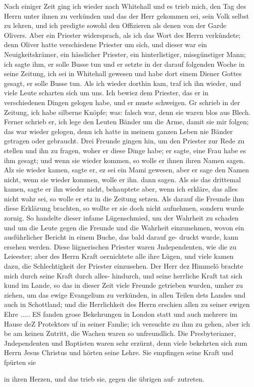 Nach einiger Zeit ging ich wieder nach Whitehall und es
trieb mich, den Tag des Herrn unter ihnen zu verkünden und
das der Herr gekommen sei, sein Volk selbst zu lehren, und ich
predigte sowohl den Offizieren 
als denen von der Garde Olivers.
Aber ein Priester widersprach, als ich das Wort des Herrn
verkündete; denn Oliver hatte verschiedene Priester um sich, und
dieser war ein Neuigkeitskrämer, ein hässlicher Priester, ein 
hinterlistiger, missgünstiger Mann; ich sagte ihm, er solle Busse tun
und er setzte in der darauf folgenden Woche in seine Zeitung,
ich sei in Whitehall gewesen und habe dort einem Diener Gottes
gesagt, er solle Busse tun. Als ich wieder dorthin kam, traf ich
ihn wieder, und viele Leute scharten sich um uns. Ich bewiez
dem Priester, das er in verschiedenen Dingen gelogen habe, und
er muste schweigen. Gr schrieb in der Zeitung, ich habe silberne
Knöpfe; was: falsch war, denn sie waren blos aus Blech. Ferner
schrieb er, ich lege den Leuten Bänder um die Arme, damit sie
mir folgen; das war wieder gelogen, denn ich hatte in meinem
ganzen Leben nie Bänder getragen oder gebraucht. Drei Freunde
gingen hin, um den Priester zur Rede zu stellen und ihn zu
fragen, woher er diese Dinge habe; er sagte, eine Frau habe es
ihm gesagt; und wenn sie wieder kommen, so wolle er ihnen ihren
Namen sagen. Alz sie wieder kamen, sagte er, ez sei ein Mami
gewesen, aber er sage den Namen nicht, wenn sie wieder kommen,
wolle er ihn. dann sagen. Als sie das drittemal kamen, sagte
er ihn wieder nicht, behauptete aber, wenn ich erkläre, das alles
nicht wahr sei, so wolle er etz in die Zeitung setzen. Als darauf
die Freunde ihm diese Erklärung brachten, so wollte er sie doch
nicht aufnehmen, sondern wurde zornig. So handelte dieser
infame Lügenschmied, um der Wahrheit zu schaden und um die
Leute gegen die Freunde und die Wahrheit einzunehmen, wovon
ein ausführlicher Bericht in einem Buche, das bald darauf ge-
druckt wurde, kann ersehen werden. Diese liignerischen Priester
waren Jndependenten, wie die zu Leieester; aber des Herrn
Kraft oernichtete alle ihre Lügen, und viele kamen dazu, die
Schlechtigkeit der Priester einzusehen. Der Herr dez Himmelö
brachte mich durch seine Kraft durch alles- hindurch, und seine
herrliche Kraft tat sich kund im Lande, so das in dieser Zeit
viele Freunde getrieben wurden, umher zu ziehen, um das ewige
Evangelium zu verkünden, in allen Teilen dets Landes und auch
in Schottland; und die Herrlichkeit des Herrn erschien allen zu
seiner ewigen Ehre ..... ES fanden grose Bekehrungen in
London statt und auch mehrere im Hause deZ Protektors uf in
seiner Famlie; ich versuchte zu ihm zu gehen, aber ich be am
keinen Zutritt, die Wachen waren so unfreundlich.
Die Presbyterianer, Jndependenten und Baptisten waren sehr
erzürnt, denn viele bekehrten sich zum Herrn Jesus Christus und
hörten seine Lehre. Sie empfingen seine Kraft und fpürten sie


in ihren Herzen, und das trieb sie, gegen die übrigen auf-
zutreten.

